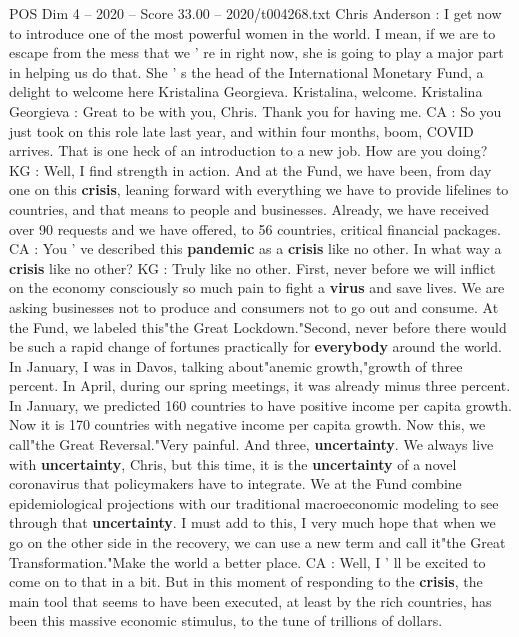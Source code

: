 \begin{textsample}{POS Dim 4 – 2020 – Score 33.00 – 2020/t004268.txt}  \label{ex:f4_pos_021}
Chris Anderson : I get now to introduce one of the most powerful women in the world.
I mean, if we are to escape from the mess that we ' re in right now, she is going to play a major part in helping us do that.
She ' s the head of the International Monetary Fund, a delight to welcome here Kristalina Georgieva.
Kristalina, welcome.
Kristalina Georgieva : Great to be with you, Chris.
Thank you for having me.
CA : So you just took on this role late last year, and within four months, boom, COVID arrives.
That is one heck of an introduction to a new job.
How are you doing?
KG : Well, I find strength in action.
And at the Fund, we have been, from day one on this \textbf{crisis}, leaning forward with everything we have to provide lifelines to countries, and that means to people and businesses.
Already, we have received over 90 requests and we have offered, to 56 countries, critical financial packages.
CA : You ' ve described this \textbf{pandemic} as a \textbf{crisis} like no other.
In what way a \textbf{crisis} like no other?
KG : Truly like no other.
First, never before we will inflict on the economy consciously so much pain to fight a \textbf{virus} and save lives.
We are asking businesses not to produce and consumers not to go out and consume.
At the Fund, we labeled this"the Great Lockdown."Second, never before there would be such a rapid change of fortunes practically for \textbf{everybody} around the world.
In January, I was in Davos, talking about"anemic growth,"growth of three percent.
In April, during our spring meetings, it was already minus three percent.
In January, we predicted 160 countries to have positive income per capita growth.
Now it is 170 countries with negative income per capita growth.
Now this, we call"the Great Reversal."Very painful.
And three, \textbf{uncertainty}.
We always live with \textbf{uncertainty}, Chris, but this time, it is the \textbf{uncertainty} of a novel coronavirus that policymakers have to integrate.
We at the Fund combine epidemiological projections with our traditional macroeconomic modeling to see through that \textbf{uncertainty}.
I must add to this, I very much hope that when we go on the other side in the recovery, we can use a new term and call it"the Great Transformation."Make the world a better place.
CA : Well, I ' ll be excited to come on to that in a bit.
But in this moment of responding to the \textbf{crisis}, the main tool that seems to have been executed, at least by the rich countries, has been this massive economic stimulus, to the tune of trillions of dollars.

\end{textsample}
